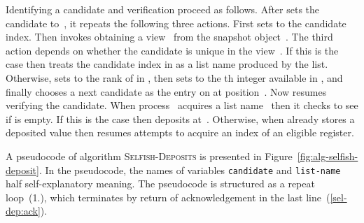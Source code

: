 \documentclass[11pt]{article}
\begin{document}
Identifying a candidate and verification proceed as follows. 
After  sets the candidate to~, it  repeats the following three actions.
First  sets  to the candidate index.
Then  invokes obtaining a view~ from the snapshot object~.
The  third action depends on whether the candidate is unique in the view~.
If this is the case then  treats the candidate index in  as a list name produced by the list.
Otherwise,  sets  to the rank of  in , then sets  to the th integer available in , and finally chooses a next candidate as the entry on  at position~.
Now  resumes verifying the candidate.
When process~ acquires a list name~ then it checks to see if  is empty.
If this is the case then  deposits at~.
Otherwise, when  already stores a deposited value then  resumes attempts to acquire an index of an eligible register. 

A pseudocode of algorithm \textsc{Selfish-Deposits} is presented in Figure~\ref{fig:alg-selfish-deposit}.
In the pseudocode, the names of variables \texttt{candidate} and \texttt{list-name} half self-explanatory meaning.
The pseudocode is structured as a repeat loop~(1.), which terminates by return of acknowledgement in the last line~(\ref{sel-dep:ack}).
\end{document}
